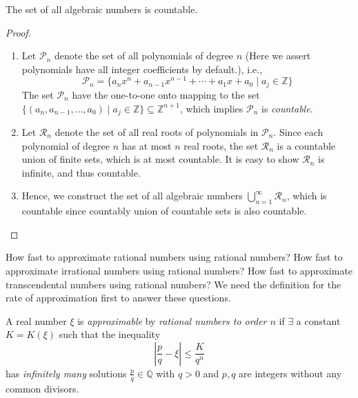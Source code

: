 \begin{proposition}
The set of all algebraic numbers is countable.
\end{proposition}
\begin{proof}
\begin{enumerate}
\item
Let $\mathcal{P}_n$ denote the set of all polynomials of degree $n$ (Here we assert polynomials have all integer coefficients by default.), i.e., 
\[
\mathcal{P}_n=\{a_nx^n+a_{n-1}x^{n-1}+\cdots+a_1x+a_0\mid a_j\in\mathbb{Z}\}
\]
The set $\mathcal{P}_n$ have the one-to-one onto mapping to the set $\{(a_n,a_{n-1},\dots,a_0)\mid a_j\in\mathbb{Z}\}\subseteq\mathbb{Z}^{n+1}$, which implies $\mathcal{P}_n$ is \emph{countable}.
\item
Let $\mathcal{R}_n$ denote the set of all real roots of polynomials in $\mathcal{P}_n$. Since each polynomial of degree $n$ has at most $n$ real roots, the set $\mathcal{R}_n$ is a countable union of finite sets, which is at most countable. It is easy to show $\mathcal{R}_n$ is infinite, and thus countable.
\item
Hence, we construct the set of all algebraic numbers $\bigcup_{n=1}^\infty\mathcal{R}_n$, which is countable since countably union of countable sets is also countable.
\end{enumerate}
\end{proof}

How fast to approximate rational numbers using rational numbers? How fast to approximate irrational numbers using rational numbers? How fast to approximate transcendental numbers using rational numbers? We need the definition for the rate of approximation first to answer these questions.

\begin{definition}
A real number $\xi$ is \emph{approximable} by \emph{rational numbers to order $n$} if $\exists$ a constant $K = K(\xi)$ such that the inequality
\[
\left|\frac{p}{q} - \xi\right|\le\frac{K}{q^n}
\]
has \emph{infinitely many} solutions $\frac{p}{q}\in\mathbb{Q}$ with $q>0$ and $p,q$ are integers without any common divisors.
\end{definition}

